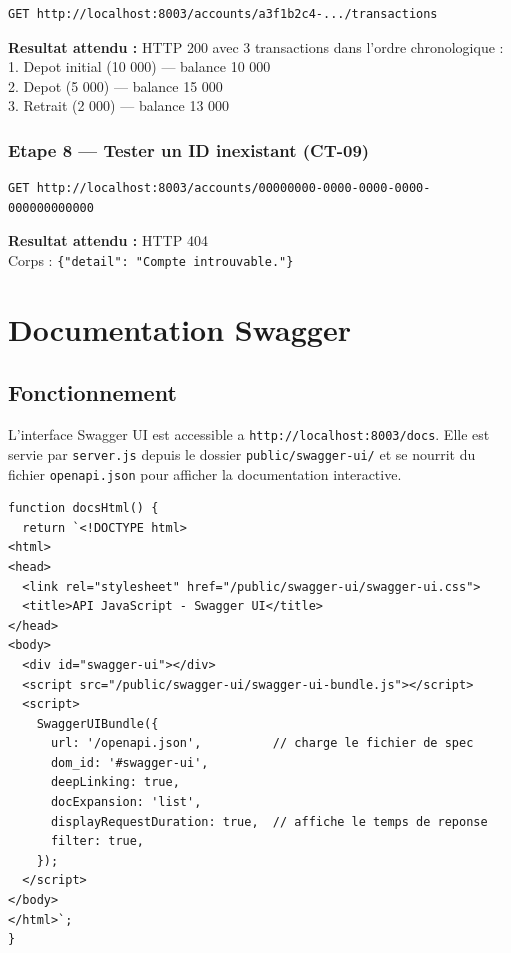 \documentclass[12pt,a4paper]{article}
\begin{document}
\begin{lstlisting}[style=bash, caption={Requete GET /accounts/\{id\}/transactions}]
GET http://localhost:8003/accounts/a3f1b2c4-.../transactions
\end{lstlisting}

\begin{successbox}
\textbf{Resultat attendu :} HTTP 200 avec 3 transactions dans l'ordre chronologique :\\
1. Depot initial (10 000) --- balance 10 000\\
2. Depot (5 000) --- balance 15 000\\
3. Retrait (2 000) --- balance 13 000
\end{successbox}

\subsubsection{Etape 8 --- Tester un ID inexistant (CT-09)}

\begin{lstlisting}[style=bash, caption={Test CT-09}]
GET http://localhost:8003/accounts/00000000-0000-0000-0000-000000000000
\end{lstlisting}

\begin{dangerbox}
\textbf{Resultat attendu :} HTTP 404\\
Corps : \texttt{\{"detail": "Compte introuvable."\}}
\end{dangerbox}

\section{Documentation Swagger}

\subsection{Fonctionnement}

L'interface Swagger UI est accessible a \texttt{http://localhost:8003/docs}. Elle est servie par \texttt{server.js} depuis le dossier \texttt{public/swagger-ui/} et se nourrit du fichier \texttt{openapi.json} pour afficher la documentation interactive.

\begin{lstlisting}[style=js, caption={server.js --- Generation de la page Swagger}]
function docsHtml() {
  return `<!DOCTYPE html>
<html>
<head>
  <link rel="stylesheet" href="/public/swagger-ui/swagger-ui.css">
  <title>API JavaScript - Swagger UI</title>
</head>
<body>
  <div id="swagger-ui"></div>
  <script src="/public/swagger-ui/swagger-ui-bundle.js"></script>
  <script>
    SwaggerUIBundle({
      url: '/openapi.json',          // charge le fichier de spec
      dom_id: '#swagger-ui',
      deepLinking: true,
      docExpansion: 'list',
      displayRequestDuration: true,  // affiche le temps de reponse
      filter: true,
    });
  </script>
</body>
</html>`;
}
\end{lstlisting}
\end{document}
